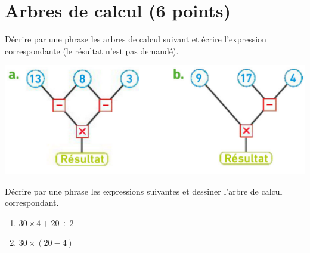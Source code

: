 \section{Arbres de calcul (6 points)}

\begin{questions}
	\question[3] Décrire par une phrase les arbres de calcul suivant et écrire l'expression correspondante (le résultat n'est pas demandé).
	
	
	\begin{center}
		\includegraphics[scale=0.3]{img/arbres}
	\end{center}
	
	\question[3] Décrire par une phrase les expressions suivantes et dessiner l'arbre de calcul correspondant.
	
	\begin{multicols}{2}
		\begin{enumerate}
			\item $30 \times 4 + 20 \div 2$
			\item $30 \times (20 - 4)$
		\end{enumerate}
	\end{multicols}	
\end{questions}

